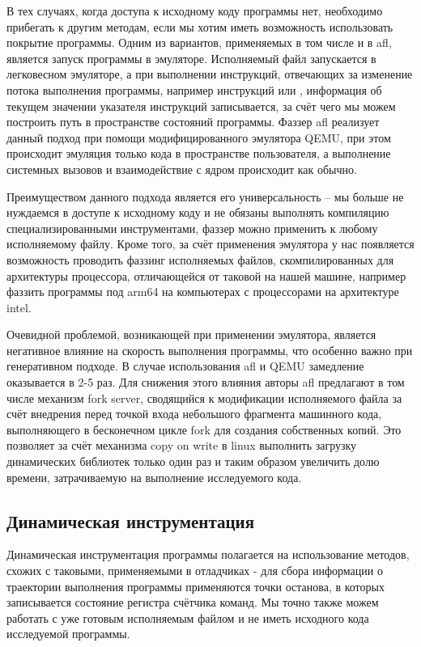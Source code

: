 В тех случаях, когда доступа к исходному коду программы нет, необходимо прибегать к другим методам, если мы хотим иметь возможность использовать покрытие программы. Одним из вариантов, применяемых в том числе и в afl, является запуск программы в эмуляторе. Исполняемый файл запускается в легковесном эмуляторе, а при выполнении инструкций, отвечающих за изменение потока выполнения программы, например инструкций  или , информация об текущем значении указателя инструкций записывается, за счёт чего мы можем построить путь в пространстве состояний программы. Фаззер afl реализует данный подход при помощи модифицированного эмулятора QEMU, при этом происходит эмуляция только кода в пространстве пользователя, а выполнение системных вызовов и взаимодействие с ядром происходит как обычно.

Преимуществом данного подхода является его универсальность -- мы больше не нуждаемся в доступе к исходному коду и не обязаны выполнять компиляцию специализированными инструментами, фаззер можно применить к любому исполняемому файлу. Кроме того, за счёт применения эмулятора у нас появляется возможность проводить фаззинг исполняемых файлов, скомпилированных для архитектуры процессора, отличающейся от таковой на нашей машине, например фаззить программы под arm64 на компьютерах с процессорами на архитектуре intel.

Очевидной проблемой, возникающей при применении эмулятора, является негативное влияние на скорость выполнения программы, что особенно важно при генеративном подходе. В случае использования afl и QEMU замедление оказывается в 2-5 раз. Для снижения этого влияния авторы afl предлагают в том числе механизм fork server, сводящийся к модификации исполняемого файла за счёт внедрения перед точкой входа небольшого фрагмента машинного кода, выполняющего в бесконечном цикле fork для создания собственных копий. Это позволяет за счёт механизма copy on write в linux выполнить загрузку динамических библиотек только один раз и таким образом увеличить долю времени, затрачиваемую на выполнение исследуемого кода.

\subsection{Динамическая инструментация}

Динамическая инструментация программы полагается на использование методов, схожих с таковыми, применяемыми в отладчиках - для сбора информации о траектории выполнения программы применяются точки останова, в которых записывается состояние регистра счётчика команд. Мы точно также можем работать с уже готовым исполняемым файлом и не иметь исходного кода исследуемой программы.

